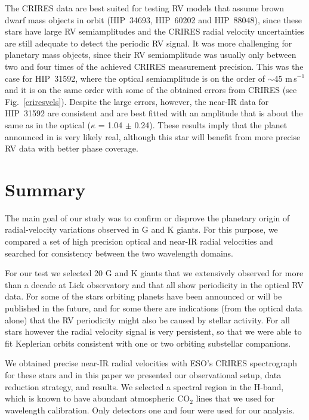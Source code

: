 \documentclass{aa}
\begin{document}
The CRIRES data are best suited for testing RV models that assume brown dwarf mass objects in orbit (HIP~34693, HIP~60202 and HIP~88048),
since these stars have large RV semiamplitudes and the CRIRES radial velocity uncertainties are still adequate to detect the periodic RV signal. 
It was more challenging for planetary mass objects, since their RV semiamplitude 
was usually only between two and four times of the achieved CRIRES measurement precision.
This was the case for HIP~31592, where the optical semiamplitude is on the order of $\sim$45 m\,s$^{-1}$ and it is on the same
order with some of the obtained errors from CRIRES (see Fig.~\ref{criresvels}).
Despite the large errors, however, the near-IR data for HIP~31592 are consistent and are best fitted with 
an amplitude that is about the same as in the optical ($\kappa$ = 1.04 $\pm$ 0.24).
These results imply that the planet announced in \citet{Wittenmyer2011} is very likely real,
although this star will benefit from more precise RV data with better phase coverage.



\section{Summary}
\label{Summary}

The main goal of our study was to confirm or disprove the planetary origin of radial-velocity variations observed in G and K giants. 
For this purpose, we compared a set of high precision optical and near-IR radial velocities and searched for 
consistency between the two wavelength domains.

For our test we selected 20 G and K giants that we extensively observed for more than a decade at Lick observatory
and  that all show periodicity in the optical RV data. For some of the stars orbiting planets have been
announced or will be published in the future, and for some there are
indications (from the optical data alone) that the RV periodicity might also be caused by stellar activity.
For all stars however the radial velocity signal is very persistent, so that we were able to
fit Keplerian orbits consistent with one or two orbiting substellar companions.

We obtained precise near-IR radial velocities with ESO's CRIRES spectrograph for these stars and in
this paper we presented our observational setup, data reduction strategy, and results. 
We selected a spectral region in the H-band, which is known to have abundant
atmospheric CO$_2$ lines that we used for wavelength calibration.
Only detectors one and four were used for our analysis. 
\end{document}
